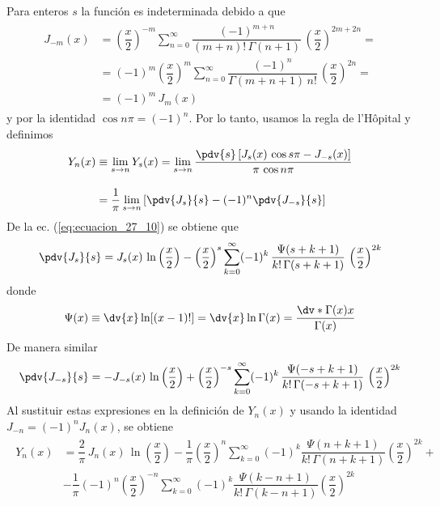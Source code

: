 Para enteros $s$ la función es indeterminada debido a que
\begin{align}
\begin{aligned}
J_{-m}(x) &= \left(\dfrac{x}{2} \right)^{-m} \sum_{n=0}^{\infty} \dfrac{(-1)^{m+n}}{(m+n)! \, \Gamma(n+1)} \, \left( \dfrac{x}{2} \right)^{2m +2n} = \\
&= (-1)^{m} \left( \dfrac{x}{2} \right)^{m} \sum_{n=0}^{\infty} \dfrac{(-1)^{n}}{\Gamma(m+n+1) \, n!} \, \left( \dfrac{x}{2} \right)^{2n} = \\
&= (-1)^{m} \, J_{m}(x)    
\end{aligned}
\label{eq:ecuacion_11_32}
\end{align}
y por la identidad $\cos n \pi = (-1)^{n}$. Por lo tanto, usamos la regla de l'Hôpital y definimos
\begin{align*}
Y_{n}(x) &\equiv \lim_{s \to n} Y_{s} (x) = \lim_{s \to n} \dfrac{\displaystyle \pdv{s} \left[ J_{s}(x) \,\cos s \pi - J_{-s}(x) \right]}{\pi \, \cos n \pi} \\[1em]
&= \dfrac{1}{\pi} \lim_{s \to n} \left[ \pdv{J_{s}}{s} - (-1)^{n} \pdv{J_{-s}}{s} \right]
\end{align*}
De la ec. (\ref{eq:ecuacion_27_10}) se obtiene que
\begin{align*}
\pdv{J_{s}}{s} = J_{s} (x) \, \ln \left( \dfrac{x}{2} \right) - \left( \dfrac{x}{2} \right)^{s} \sum_{k=0}^{\infty} (-1)^{k} \, \dfrac{\Psi(s + k + 1)}{k! \, \Gamma(s + k + 1)} \, \left( \dfrac{x}{2} \right)^{2k}
\end{align*}
donde
\begin{align*}
\Psi (x) \equiv \dv{x} \ln[(x - 1)!] = \dv{x} \ln \Gamma (x) = \dfrac{\dv*{\Gamma(x)}{x}}{\Gamma (x)}
\end{align*}
De manera similar
\begin{align*}
\pdv{J_{-s}}{s} = -J_{-s} (x) \, \ln \left( \dfrac{x}{2} \right) + \left( \dfrac{x}{2} \right)^{-s} \sum_{k=0}^{\infty} (-1)^{k} \, \dfrac{\Psi(-s + k + 1)}{k! \, \Gamma(-s + k + 1)} \, \left( \dfrac{x}{2} \right)^{2k}
\end{align*}
Al sustituir estas expresiones en la definición de $Y_{n}(x)$ y usando la identidad $J_{-n} = (-1)^{n} J_{n}(x)$, se obtiene
\begin{align}
\begin{aligned}
Y_{n} (x) &= \dfrac{2}{\pi} \, J_{n} (x) \, \ln \left(\dfrac{x}{2} \right) - \dfrac{1}{\pi} \left( \dfrac{x}{2} \right)^{n} \sum_{k=0}^{\infty} (-1)^{k} \dfrac{\Psi (n + k + 1)}{k! \, \Gamma (n + k + 1)} \left(\dfrac{x}{2} \right)^{2k} + \\
&- \dfrac{1}{\pi} (-1)^{n} \left( \dfrac{x}{2} \right)^{-n} \sum_{k=0}^{\infty} (-1)^{k} \dfrac{\Psi (k - n + 1)}{k! \, \Gamma (k - n + 1)} \left(\dfrac{x}{2} \right)^{2k}
\end{aligned}
\label{eq:ecuacion_27_12}
\end{align}
